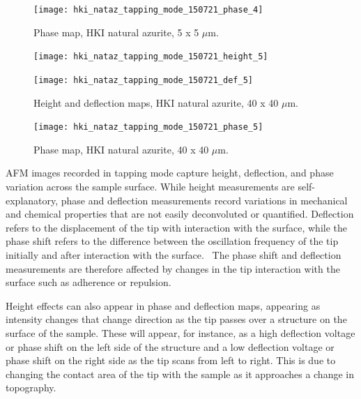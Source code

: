 \begin{figure}[H]
\centering
  \texttt{[image: hki\_nataz\_tapping\_mode\_150721\_phase\_4]}
\caption[Phase map, HKI natural azurite]{Phase map, HKI natural azurite, 5 x 5 $\mu$m.}
\label{fig:afm_hki_nataz_phase_4}
\end{figure}


\begin{figure}[H]
\centering
\begin{minipage}{.45\textwidth}
  \centering
  \texttt{[image: hki\_nataz\_tapping\_mode\_150721\_height\_5]}
\end{minipage}
\begin{minipage}{.45\textwidth}
  \centering
  \texttt{[image: hki\_nataz\_tapping\_mode\_150721\_def\_5]}
\end{minipage}
\caption[Height and deflection maps, HKI natural azurite]{Height and deflection maps, HKI natural azurite, 40 x 40 $\mu$m.}
\label{fig:afm_hki_nataz_height_def_5}
\end{figure}

\begin{figure}[H]
\centering
  \texttt{[image: hki\_nataz\_tapping\_mode\_150721\_phase\_5]}
\caption[Phase map, HKI natural azurite]{Phase map, HKI natural azurite, 40 x 40 $\mu$m.}
\label{fig:afm_hki_nataz_phase_5}
\end{figure}


AFM images recorded in tapping mode capture height, deflection, and phase variation across the sample surface. While height measurements are self-explanatory, phase and deflection measurements record variations in mechanical and chemical properties that are not easily deconvoluted or quantified. Deflection refers to the displacement of the tip with interaction with the surface, while the phase shift refers to the difference between the oscillation frequency of the tip initially and after interaction with the surface.~\autocite{iscpi} The phase shift and deflection measurements are therefore affected by changes in the tip interaction with the surface such as adherence or repulsion. 

Height effects can also appear in phase and deflection maps, appearing as intensity changes that change direction as the tip passes over a structure on the surface of the sample. These will appear, for instance, as a high deflection voltage or phase shift on the left side of the structure and a low deflection voltage or phase shift on the right side as the tip scans from left to right. This is due to changing the contact area of the tip with the sample as it approaches a change in topography.~\autocite{iscpi} 

